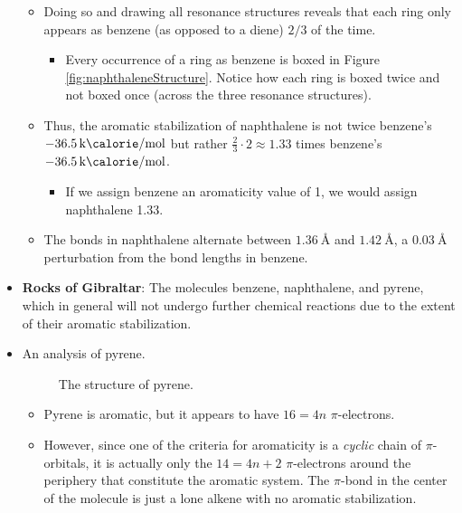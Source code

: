 \documentclass[../notes.tex]{subfiles}
\begin{document}
\begin{itemize}
\begin{itemize}
        \item Doing so and drawing all resonance structures reveals that each ring only appears as benzene (as opposed to a diene) $2/3$ of the time.
        \begin{itemize}
            \item Every occurrence of a ring as benzene is boxed in Figure \ref{fig:naphthaleneStructure}. Notice how each ring is boxed twice and not boxed once (across the three resonance structures).
        \end{itemize}
        \item Thus, the aromatic stabilization of naphthalene is not twice benzene's $\SI[per-mode=symbol]{-36.5}{\kilo\calorie\per\mole}$ but rather $\frac{2}{3}\cdot 2\approx 1.33$ times benzene's $\SI[per-mode=symbol]{-36.5}{\kilo\calorie\per\mole}$.
        \begin{itemize}
            \item If we assign benzene an aromaticity value of 1, we would assign naphthalene 1.33.
        \end{itemize}
        \item The bonds in naphthalene alternate between $\SI{1.36}{\angstrom}$ and $\SI{1.42}{\angstrom}$, a $\SI{0.03}{\angstrom}$ perturbation from the bond lengths in benzene.
    \end{itemize}
    \item \textbf{Rocks of Gibraltar}: The molecules benzene, naphthalene, and pyrene, which in general will not undergo further chemical reactions due to the extent of their aromatic stabilization.
    \item An analysis of pyrene.
    \begin{figure}[H]
        \centering
        \footnotesize
        \caption{The structure of pyrene.}
        \label{fig:pyreneStructure}
    \end{figure}
    \begin{itemize}
        \item Pyrene is aromatic, but it appears to have $16=4n$ $\pi$-electrons.
        \item However, since one of the criteria for aromaticity is a \emph{cyclic} chain of $\pi$-orbitals, it is actually only the $14=4n+2$ $\pi$-electrons around the periphery that constitute the aromatic system. The $\pi$-bond in the center of the molecule is just a lone alkene with no aromatic stabilization.

\end{itemize}
\end{itemize}
\end{document}
